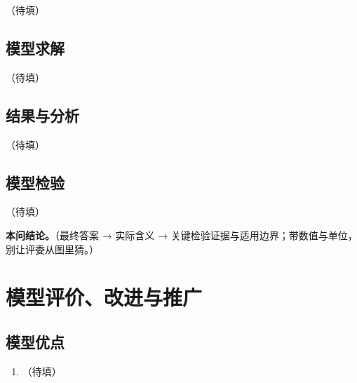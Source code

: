 \documentclass[withoutpreface,bwprint]{cumcmthesis}
\renewcommand{\textbf}[1]{{\song\bfseries #1}}
\begin{document}
（待填）


\subsection{模型求解}

（待填）

\subsection{结果与分析}

（待填）


\subsection{模型检验}

（待填）

\textbf{本问结论。}（最终答案 → 实际含义 → 关键检验证据与适用边界；带数值与单位，别让评委从图里猜。）

\section{模型评价、改进与推广}

\subsection{模型优点}

\begin{enumerate}
  \item （待填）
\end{enumerate}
\end{document}
